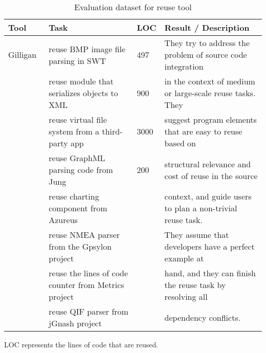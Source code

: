 \begin{table*}[ht]
\begin{center}
\caption{Evaluation dataset for reuse tool }
\label{tab:total}
\vspace{1mm}
\scriptsize{
\begin{tabular*}{1\textwidth}{@{}l|l|l|l@{}} \hline
Tool&Task&LOC&Result / Description\\\hline
Gilligan~\cite{Holmes:reuse07}&reuse BMP image file parsing in SWT&497&They try to address the problem of source code integration \\
&reuse  module that serializes objects to XML&900& in the context of medium or large-scale reuse tasks. They  \\
&reuse virtual file system from a third-party app&3000& suggest program elements that are easy to reuse based on \\
&reuse GraphML parsing code from Jung&200& structural  relevance and cost of reuse in the source  \\ 
&reuse charting component from Azureus&& context,  and guide  users to  plan a non-trivial reuse task.  \\
&reuse NMEA parser from the Gpsylon project&&They assume that developers have a perfect example at \\
&reuse the lines of code counter from Metrics project&&hand,  and they can finish the reuse task by resolving all\\
&reuse QIF parser from jGnash project&& dependency conflicts.\\ \hline

\end{tabular*}
 \label{tab:reuse}

LOC represents the lines of code that are reused.

}
 \end{center}
\end{table*}



